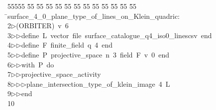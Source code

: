 %
%
\begin{tabbing}
55555 \= 55 \= 55 \= 55 \= 55 \= 55 \= 55 \= 55 \= 55 \= 55 \= 55 \= 55 \= 55 \= \>surface\_4\_0\_plane\_type\_of\_lines\_on\_Klein\_quadric:\\[0pt]
2\>$\triangleright$\>(ORBITER)\ v\ 6\ \\[0pt]
3\>$\triangleright$\>$\triangleright$\>define\ L\ vector\ file\ surface\_catalogue\_q4\_iso0\_linescsv\ end\ \\[0pt]
4\>$\triangleright$\>$\triangleright$\>define\ F\ finite\_field\ q\ 4\ end\ \\[0pt]
5\>$\triangleright$\>$\triangleright$\>define\ P\ projective\_space\ n\ 3\ field\ F\ v\ 0\ end\ \\[0pt]
6\>$\triangleright$\>$\triangleright$\>with\ P\ do\ \\[0pt]
7\>$\triangleright$\>$\triangleright$\>projective\_space\_activity\ \\[0pt]
8\>$\triangleright$\>$\triangleright$\>$\triangleright$\>plane\_intersection\_type\_of\_klein\_image\ 4\ L\ \\[0pt]
9\>$\triangleright$\>$\triangleright$\>end\ \\[0pt]
10\>\end{tabbing}
